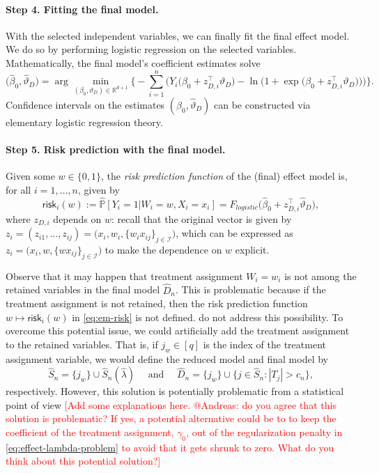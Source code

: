 \documentclass[11pt]{article}
\renewcommand{\P}{\mathbb{P}}
\newcommand{\R}{\mathbb{R}}
\begin{document}
\paragraph{Step 4. Fitting the final model.} With the selected independent variables, we can finally fit the final effect model. We do so by performing logistic regression on the selected variables. Mathematically, the final model's coefficient estimates solve
\begin{equation*} 
    \big(\widehat{\beta}_0, \widehat{\vartheta}_D\big)
    =
    \arg\min_{(\beta_0, \vartheta_D) \in \R^{d+1}}
    \Bigg\{
    - 
    \sum_{i=1}^n \bigg( Y_i \big(\beta_0 + z_{D,i}^\top \vartheta_D \big) - \ln\Big( 1 + \exp \big(\beta_0 + z_{D,i}^\top \vartheta_D\big) \Big)\bigg)\Bigg\}.
\end{equation*}
Confidence intervals on the estimates $(\widehat{\beta}_0, \widehat{\vartheta}_D)$ can be constructed via elementary logistic regression theory.

\paragraph{Step 5. Risk prediction with the final model.}
Given some $w \in \{0,1\}$, the \textit{risk prediction function} of the (final) effect model is, for all $i=1,\dots,n$, given by
\begin{equation}\label{eq:em-risk}
    \textsf{risk}_i(w)
    :=
    \widehat{\P}[Y_i=1 | W_i = w, X_i = x_i] 
    =
    F_{logistic}\Big(\widehat{\beta}_0 +
    z_{D,i}^\top \widehat{\vartheta}_{D}\Big), 
\end{equation}
where $z_{D,i}$ depends on $w$: recall that the original vector is given by $z_i = (z_{i1},\dots, z_{ij}) = \big(x_i, w_i, \{ w_i x_{ij} \}_{j\in\mathcal{I}}\big)$, which can be expressed as $z_i = \big(x_i, w, \{ w x_{ij} \}_{j\in\mathcal{I}}\big)$ to make the dependence on $w$ explicit.

Observe that it may happen that treatment assignment $W_i = w_i$ is not among the retained variables in the final model $\widehat{D}_n$. This is problematic because if the treatment assignment is not retained, then the risk prediction function $w \mapsto \textsf{risk}_i(w)$ in \eqref{eq:em-risk} is not defined. \cite{kent2020path} do not address this possibility. To overcome this potential issue, we could artificially add the treatment assignment to the retained variables. That is, if $j_w\in[q]$ is the index of the treatment assignment variable, we would define the reduced model and final model by
\[
    \widehat{S}_n = \{j_w\} \cup \widehat{S}_n(\widehat{\lambda})
    \quad \text{ and } \quad
    \widehat{D}_n =  \{j_w\} \cup \Big\{ j\in\widehat{S}_n : |T_j| > c_n \Big\},
\]
respectively. However, this solution is potentially problematic from a statistical point of view \textcolor{red}{[Add some explanations here. @Andreas: do you agree that this solution is problematic? If yes, a potential alternative could be to to keep the coefficient of the treatment assignment, $\gamma_0$, out of the regularization penalty in \eqref{eq:effect-lambda-problem} to avoid that it gets shrunk to zero. What do you think about this potential solution?]}
\end{document}
